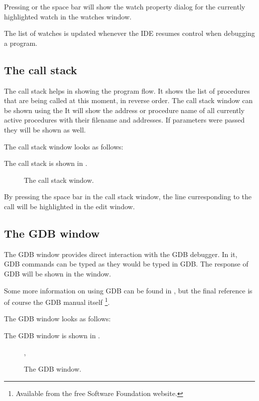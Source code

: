 Pressing  or the space bar will show the watch property dialog
for the currently highlighted watch in the watches window.

The list of watches is updated whenever the IDE resumes control when
debugging a program.
%
%
\subsection{The call stack}
\label{se:callstack}
The call stack helps in showing the program flow. It shows the list of
procedures that are being called at this moment, in reverse order.
The call stack window can be shown using the 
It will show the address or procedure name of all currently active 
procedures with their filename and addresses. If parameters were passed
they will be shown as well.
\begin{htmlonly}

The call stack window looks as follows:
\end{htmlonly}
\begin{latexonly}
The call stack is shown in .
\begin{figure}[ht]
\begin{center}
\caption{The call stack window.}\label{fig:callstack}
\ifpdf
{}
\else
{}
\fi
\end{center}
\end{figure}
\end{latexonly}

By pressing the space bar in the call stack window, the line curresponding
to the call will be highlighted in the edit window.

\subsection{The GDB window}
\label{se:gdbwindow}
The GDB window provides direct interaction with the GDB debugger.
In it, GDB commands can be typed as they would be typed in GDB.
The response of GDB will be shown in the window.

Some more information on using GDB can be found in , but
the final reference is of course the GDB manual itself
\footnote{Available from the free Software Foundation website.}.

\begin{htmlonly}
The GDB window looks as follows:
\end{htmlonly}
\begin{latexonly}
The GDB window is shown in .
\begin{figure}[ht]
\begin{center}
\caption{The GDB window.}\label{fig:gdbwin}
\ifpdf
{}
\else
{},
\fi
\end{center}
\end{figure}
\end{latexonly}

